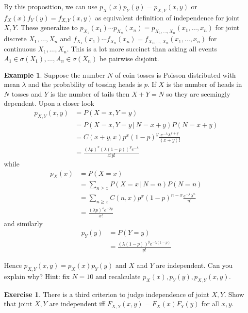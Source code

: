 \documentclass[12pt]{amsart}
\theoremstyle{definition}
\newtheorem{example}[theorem]{Example}
\newtheorem{exercise}[theorem]{Exercise}
\begin{document}
By this proposition, we can use $p_X(x)p_Y(y) = p_{X, Y}(x, y)$ or $f_X(x)f_Y(y) = f_{X, Y}(x, y)$ as equivalent definition of independence for joint $X, Y$. These generalize to $p_{X_1}(x_1) \cdots p_{X_n}(x_n) = p_{X_1, \dots , X_n}(x_1, \dots , x_n)$ for joint discrete $X_1, \dots , X_n$ and $f_{X_1}(x_1) \cdots f_{X_n}(x_n) = f_{X_1, \dots , X_n}(x_1, \dots , x_n)$ for continuous $X_1, \dots , X_n$. This is a lot more succinct than asking all events $A_1 \in \sigma(X_1), \dots , A_n \in \sigma(X_n)$ be pairwise disjoint.

\begin{example} Suppose the number $N$ of coin tosses is Poisson distributed with mean $\lambda$ and the probability of tossing heads is $p$. If $X$ is the number of heads in $N$ tosses and $Y$ is the number of tails then $X + Y = N$ so they are seemingly dependent. Upon a closer look
\begin{align*}
p_{X, Y}(x, y) & = P(X = x, Y = y) \\
 & = P(X = x, Y = y \,|\, N = x + y)P(N = x + y) \\
 & = C(x + y, x) p^x(1 - p)^y \frac{e^{-\lambda}\lambda^{x+y}}{(x + y)!} \\
 & = \frac{(\lambda p)^x(\lambda (1 - p))^y e^{-\lambda}}{x!y!}
\end{align*}
while
\begin{align*}
p_X(x) & = P(X = x) \\
 & = \sum\limits_{n \geq x}P(X = x \,|\, N = n)P(N = n) \\
 & = \sum\limits_{n \geq x} C(n, x) p^x(1 - p)^{n-x} \frac{e^{-\lambda}\lambda^n}{n!} \\
 & = \frac{(\lambda p)^x e^{-\lambda p}}{x!}
\end{align*}
and similarly
\begin{align*}
p_Y(y) & = P(Y = y) \\
 & = \frac{(\lambda(1- p))^y e^{-\lambda(1- p)}}{y!}
\end{align*}

Hence $p_{X, Y}(x, y) = p_X(x)p_Y(y)$ and $X$ and $Y$ are independent. Can you explain why? Hint: fix $N = 10$ and recalculate $p_X(x), p_Y(y), p_{X, Y}(x, y)$.
\end{example}

\begin{exercise} There is a third criterion to judge independence of joint $X, Y$. Show that joint $X, Y$ are independent iff $F_{X, Y}(x, y) = F_X(x)F_Y(y)$ for all $x, y$.
\end{exercise}
\end{document}
